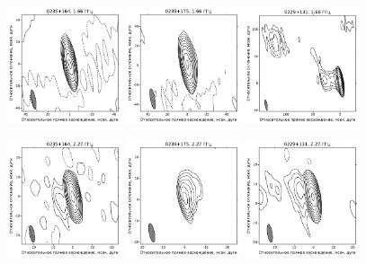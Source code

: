 \addtocounter{figure}{-1}
\begin{figure}
  \centering

  \includegraphics[width=0.3\textwidth]{0235+164_L.pdf}
  \includegraphics[width=0.3\textwidth]{0239+175_L.pdf}
  \includegraphics[width=0.3\textwidth]{0229+131_L.pdf}


  \includegraphics[width=0.3\textwidth]{0235+164_S.pdf}
  \includegraphics[width=0.3\textwidth]{0239+175_S.pdf}
  \includegraphics[width=0.3\textwidth]{0229+131_S.pdf}



\end{figure}

